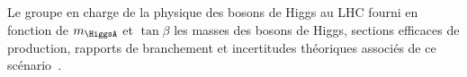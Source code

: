 \par
Le groupe en charge de la physique des bosons de Higgs au LHC
fourni en fonction de $m_{\HiggsA}$ et $\tan\beta$
les masses des bosons de Higgs, sections efficaces de production, rapports de branchement et incertitudes théoriques
associés de ce scénario~\cite{MSSMneutralHiggsTwiki}.
%
